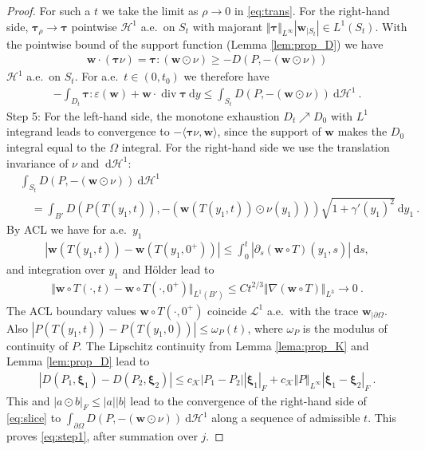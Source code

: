 \documentclass{article}
\theoremstyle{definition}
\newcommand{\bfw}{\boldsymbol{w}}
\newcommand{\bftau}{\boldsymbol{\tau}}
\newcommand{\bfxi}{\boldsymbol{\xi}}
\newcommand{\K}{\mathcal{K}}
\newcommand{\dd}{\:\mathrm{d}}
\renewcommand\div{\operatorname{\mathrm{div}}}
\begin{document}
\begin{proof}
    For such a $t$ we take the limit as $\rho \rightarrow 0$ in \eqref{eq:trans}.
    For the right-hand side, $\bftau_\rho \rightarrow \bftau$ pointwise $\mathcal{H}^1$ a.e.\ on $S_t$ with majorant $\Vert \bftau\Vert_{L^\infty}|\bfw_{|S_t}| \in L^1(S_t)$.
    With the pointwise bound of the support function (Lemma \ref{lem:prop_D}) we have
    \begin{align*}
        \bfw \cdot (\bftau\nu) = \bftau : (\bfw\odot \nu) \geq - D(P, -(\bfw\odot \nu))
    \end{align*}
    $\mathcal{H}^1$ a.e.\ on $S_t$. For a.e.\ $t\in(0,t_0)$ we therefore have
    \begin{align}
        -\int_{D_t} \bftau : \varepsilon(\bfw) + \bfw\cdot\div\bftau \dd y
        \leq \int_{S_t} D(P, -(\bfw\odot \nu)) \dd \mathcal{H}^1 \ . \label{eq:slice}
    \end{align}
    Step 5:
    For the left-hand side, the monotone exhaustion $D_t \nearrow D_0$ with
    $L^1$ integrand leads to convergence to $-\langle \bftau\nu, \bfw\rangle$, since
    the support of $\bfw$ makes the $D_0$ integral equal to the $\Omega$ integral.
    For the right-hand side we use the translation invariance of $\nu$ and $\dd \mathcal{H}^1$:
    \begin{align*}
        &\int_{S_t} D(P, -(\bfw\odot \nu)) \dd \mathcal{H}^1\\
        &\quad=\int_{B'} D(P(T(y_1,t)), -(\bfw (T(y_1,t))\odot \nu(y_1))) \sqrt{1+\gamma'(y_1)^2} \dd y_1 \ .
    \end{align*}
    By ACL we have for a.e.\ $y_1$
    \begin{align*}
        |\bfw (T(y_1,t)) - \bfw (T(y_1,0^+))| \leq \int_{0}^{t} |\partial_s(\bfw\circ T)(y_1,s)| \dd s,
    \end{align*}
    and integration over $y_1$ and H\"older lead to
    \begin{align*}
        \Vert \bfw \circ T(\cdot, t) - \bfw \circ T(\cdot, 0^+)\Vert_{L^1(B')}
        \leq  C t^{2/3} \Vert \nabla(\bfw \circ T)\Vert_{L^3} \rightarrow 0 \ .
    \end{align*}
    The ACL boundary values $\bfw \circ T(\cdot, 0^{+})$ coincide $\mathcal{L}^{1}$ a.e.\ with the trace $\bfw_{|\partial\Omega}$.
    Also $|P(T(y_1,t))-P(T(y_1,0))| \leq \omega_P(t)$, where $\omega_P$ is the modulus of continuity of $P$.
    The Lipschitz continuity from Lemma \ref{lema:prop_K} and Lemma \ref{lem:prop_D} lead to
    \begin{align*}
        |D(P_1,\bfxi_1) - D(P_2,\bfxi_2)| \leq c_\K |P_1-P_2| |\bfxi_1|_F + c_\K \Vert P\Vert_{L^\infty}
        |\bfxi_1-\bfxi_2|_F \ .
    \end{align*}
    This and $|a\odot b|_F \leq |a||b|$ lead to the convergence of the right-hand side of \eqref{eq:slice}
    to $\int_{\partial\Omega} D(P,-(\bfw\odot \nu)) \dd \mathcal{H}^1$ along a sequence of admissible $t$. This proves \eqref{eq:step1}, after summation over $j$.


\end{proof}
\end{document}

